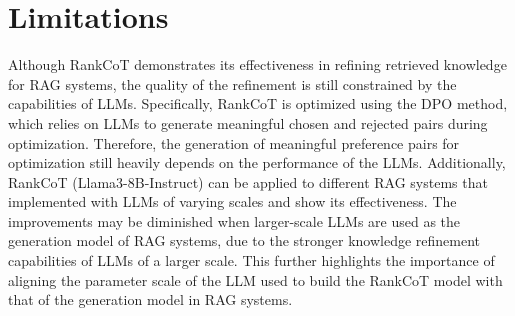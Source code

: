 \section*{Limitations}
Although RankCoT demonstrates its effectiveness in refining retrieved knowledge for RAG systems, the quality of the refinement is still constrained by the capabilities of LLMs. Specifically, RankCoT is optimized using the DPO method, which relies on LLMs to generate meaningful chosen and rejected pairs during optimization. Therefore, the generation of meaningful preference pairs for optimization still heavily depends on the performance of the LLMs. Additionally, RankCoT (Llama3-8B-Instruct) can be applied to different RAG systems that implemented with LLMs of varying scales and show its effectiveness. The improvements may be diminished when larger-scale LLMs are used as the generation model of RAG systems, due to the stronger knowledge refinement capabilities of LLMs of a larger scale. This further highlights the importance of aligning the parameter scale of the LLM used to build the RankCoT model with that of the generation model in RAG systems.

